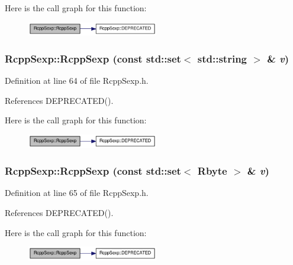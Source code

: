 Here is the call graph for this function:\nopagebreak
\begin{figure}[H]
\begin{center}
\leavevmode
\includegraphics[width=162pt]{classRcppSexp_ab7e14928df338b3d0280685bf89c0af4_cgraph}
\end{center}
\end{figure}
\hypertarget{classRcppSexp_a991a6f440c8a294f2dc88530440fc3e3}{
\subsubsection[{RcppSexp}]{\setlength{\rightskip}{0pt plus 5cm}RcppSexp::RcppSexp (const std::set$<$ std::string $>$ \& {\em v})}}
\label{classRcppSexp_a991a6f440c8a294f2dc88530440fc3e3}


Definition at line 64 of file RcppSexp.h.

References DEPRECATED().

Here is the call graph for this function:\nopagebreak
\begin{figure}[H]
\begin{center}
\leavevmode
\includegraphics[width=162pt]{classRcppSexp_a991a6f440c8a294f2dc88530440fc3e3_cgraph}
\end{center}
\end{figure}
\hypertarget{classRcppSexp_a429ba2c201e1535e1884d819b25479be}{
\subsubsection[{RcppSexp}]{\setlength{\rightskip}{0pt plus 5cm}RcppSexp::RcppSexp (const std::set$<$ Rbyte $>$ \& {\em v})}}
\label{classRcppSexp_a429ba2c201e1535e1884d819b25479be}


Definition at line 65 of file RcppSexp.h.

References DEPRECATED().

Here is the call graph for this function:\nopagebreak
\begin{figure}[H]
\begin{center}
\leavevmode
\includegraphics[width=162pt]{classRcppSexp_a429ba2c201e1535e1884d819b25479be_cgraph}
\end{center}
\end{figure}


